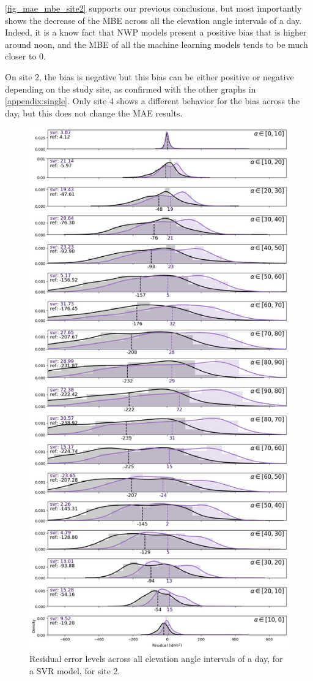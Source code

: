     \autoref{fig_mae_mbe_site2} supports our previous conclusions, but most importantly shows the decrease of the MBE across all the elevation angle intervals of a day.
Indeed, it is a know fact that NWP models present a positive bias that is higher around noon, and the MBE of all the machine learning models tends to be much closer to 0.

On site 2, the bias is negative but this bias can be either positive or negative depending on the study site, as confirmed with the other graphs in \autoref{appendix:single}.
Only site 4 shows a different behavior for the bias across the day, but this does not change the MAE results. 
\begin{figure}[htb!]
    \centering
    \includegraphics[width=\columnwidth]{figures/first_study/residual_errors_svr_site2_mae.png}
\caption{Residual error levels across all elevation angle intervals of a day, for a SVR model, for site 2.}
\end{figure}

